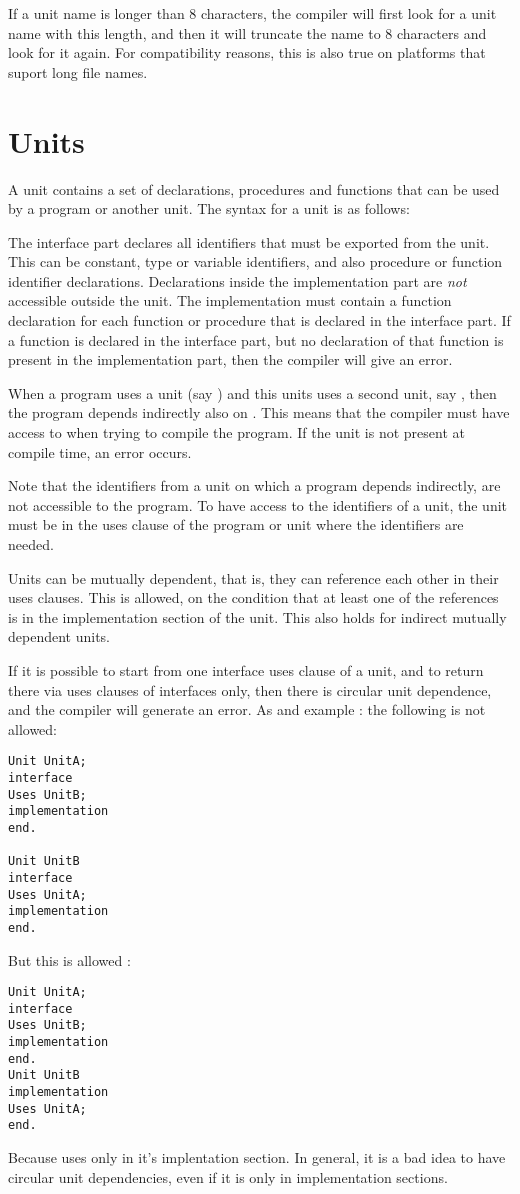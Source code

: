 If a unit name is longer than 8 characters, the compiler will first look for
a unit name with this length, and then it will truncate the name to 8
characters and look for it again. For compatibility reasons, this is also
true on platforms that suport long file names.

\section{Units}
A unit contains a set of declarations, procedures and functions that can be
used by a program or another unit.
The syntax for a unit is as follows:

The interface part declares all identifiers that must be exported from the
unit. This can be constant, type or variable identifiers, and also procedure
or function identifier declarations. Declarations inside the
implementation part are {\em not} accessible outside the unit. The
implementation must contain a function declaration for each function or
procedure that is declared in the interface part. If a function is declared
in the interface part, but no declaration of that function is present in the
implementation part, then the compiler will give an error.

When a program uses a unit (say ) and this units uses a second
unit, say , then the program depends indirectly also on
. This means that the compiler must have access to  when
trying to compile the program. If the unit is not present at compile time,
an error occurs.

Note that the identifiers from a unit on which a program depends indirectly,
are not accessible to the program. To have access to the identifiers of a
unit, the unit must be in the uses clause of the program or unit where the
identifiers are needed.

Units can be mutually dependent, that is, they can reference each other in
their uses clauses. This is allowed, on the condition that at least one of
the references is in the implementation section of the unit. This also holds
for indirect mutually dependent units.

If it is possible to start from one interface uses clause of a unit, and to return
there via uses clauses of interfaces only, then there is circular unit
dependence, and the compiler will generate an error.
As and example : the following is not allowed:
\begin{verbatim}
Unit UnitA;
interface
Uses UnitB;
implementation
end.

Unit UnitB
interface
Uses UnitA;
implementation
end.
\end{verbatim}
But this is allowed :
\begin{verbatim}
Unit UnitA;
interface
Uses UnitB;
implementation
end.
Unit UnitB
implementation
Uses UnitA;
end.
\end{verbatim}
Because  uses  only in it's implentation section.
In general, it is a bad idea to have circular unit dependencies, even if it is
only in implementation sections.

